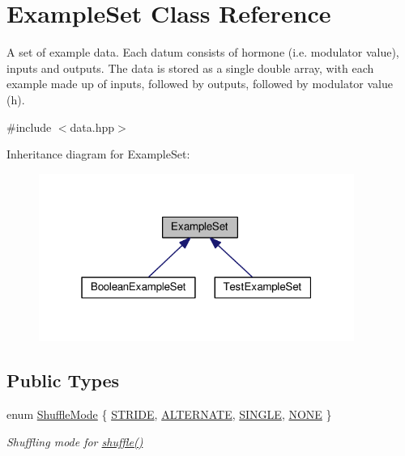 \hypertarget{classExampleSet}{}\section{Example\+Set Class Reference}
\label{classExampleSet}


A set of example data. Each datum consists of hormone (i.\+e. modulator value), inputs and outputs. The data is stored as a single double array, with each example made up of inputs, followed by outputs, followed by modulator value (h).  




{\ttfamily \#include $<$data.\+hpp$>$}



Inheritance diagram for Example\+Set\+:
\nopagebreak
\begin{figure}[H]
\begin{center}
\leavevmode
\includegraphics[width=292pt]{classExampleSet__inherit__graph}
\end{center}
\end{figure}
\subsection*{Public Types}
\begin{DoxyCompactItemize}
\item 
enum \hyperlink{classExampleSet_afcdcdbc9a02c53864997e334d8bae33d}{Shuffle\+Mode} \{ \hyperlink{classExampleSet_afcdcdbc9a02c53864997e334d8bae33da7dfbbc7c9fb69bf8aacc556a1eaf4480}{S\+T\+R\+I\+DE}, 
\hyperlink{classExampleSet_afcdcdbc9a02c53864997e334d8bae33dacc61e53a68e337018a03252922ebc6b1}{A\+L\+T\+E\+R\+N\+A\+TE}, 
\hyperlink{classExampleSet_afcdcdbc9a02c53864997e334d8bae33dab2b8cedf3f694baf320ce881237c7833}{S\+I\+N\+G\+LE}, 
\hyperlink{classExampleSet_afcdcdbc9a02c53864997e334d8bae33dad0bd9d15e4bf63f5038da60af9c4ae07}{N\+O\+NE}
 \}\begin{DoxyCompactList}\small\item\em Shuffling mode for \hyperlink{classExampleSet_a2df897c759c7cc03475f68fd1f4834b9}{shuffle()} \end{DoxyCompactList}
\end{DoxyCompactItemize}
